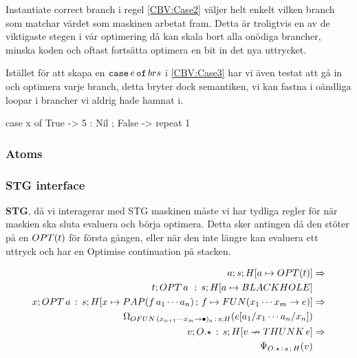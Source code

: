 \documentclass[../Optimise]{subfiles}
\begin{document}
Instantiate correct branch i regel \eqref{CBV:Case2} väljer helt enkelt vilken branch som matchar
värdet som maskinen arbetat fram. Detta är troligtvis en av de viktigaste
stegen i vår optimering då kan skala bort alla onödiga brancher, minska koden 
och oftast fortsätta optimera en bit in det nya uttrycket.

Istället för att skapa en $\mathtt{case}\,e\,\mathtt{of}\,brs$ i \eqref{CBV:Case3} har vi även testat att gå in
och optimera varje branch, detta bryter dock semantiken, vi kan fastna
i oändliga loopar i brancher vi aldrig hade hamnat i. 

\begin{codeEx}
case x of
    { True  -> 5 : Nil
    ; False -> repeat 1
    }
\end{codeEx}

\subsubsection{Atoms}


\subsubsection{STG interface}
\textbf{STG}, då vi interagerar med STG maskinen måste vi har tydliga regler
för när maskien ska sluta evaluera och börja optimera. Detta sker
antingen då den stöter på en $OPT(t)$ för första gången, eller när den
inte längre kan evaluera ett uttryck och har en Optimise continuation
på stacken.

\begin{align}
a;s;H[a\mapsto OPT(t)] & \Rightarrow\\
t;OPT\,a\,\,:\,s;H[a\mapsto BLACKHOLE]\\
x;OPT\,a\,:\,s;H[x\mapsto PAP(f\,a_{1}\cdots a_{n})\,;\,f\mapsto FUN(x_{1}\cdots x_{m}\to e)] & \Rightarrow\\
\Omega_{OFUN\,(x_{n+1}\cdots x_{m}\to\bullet)_{a}\,:\,s;H}(e[a_{1}/x_{1}\cdots a_{n}/x_{n}])\\
v;O.\star\,:\, s;H[v\nrightarrow THUNK\,e] & \Rightarrow\\
\Psi_{O.\star\,:\, s\,;\,H}(v)
\end{align}
\end{document}
